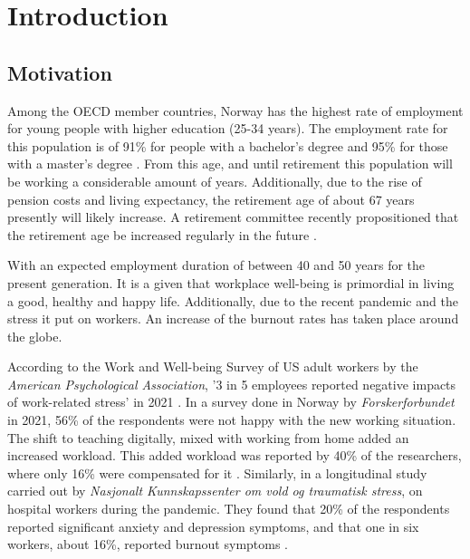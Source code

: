 \chapter{Introduction}


\section{Motivation}
Among the OECD member countries, Norway has the highest rate of employment for young people with higher education (25-34 years). The employment rate for this population is of 91\% for people with a bachelor's degree and 95\% for those with a master's degree \parencite{fazli_hoy_2022}. From this age, and until retirement this population will be working a considerable amount of years. Additionally, due to the rise of pension costs and living expectancy, the retirement age of about 67 years presently \parencite{noauthor_pensjonsalder_nodate} will likely increase. A retirement committee recently propositioned that the retirement age be increased regularly in the future \parencite{haugan_pensjonsutvalget_2022}.

With an expected employment duration of between 40 and 50 years for the present generation. It is a given that workplace well-being is primordial in living a good, healthy and happy life. Additionally, due to the recent pandemic and the stress it put on workers. An increase of the burnout rates has taken place around the globe. 

According to the Work and Well-being Survey of US adult workers by the \textit{American Psychological Association}, '3 in 5 employees reported negative impacts of work-related stress' in 2021 \parencite{abramson_burnout_2022}. In a survey done in Norway by \textit{Forskerforbundet} in 2021, 56\% of the respondents were not happy with the new working situation. The shift to teaching digitally, mixed with working from home added an increased workload. This added workload was reported by 40\% of the researchers, where only 16\% were compensated for it \parencite{svarstad_tarene_2021}. Similarly, in a longitudinal study carried out by \textit{Nasjonalt Kunnskapssenter om vold og traumatisk stress}, on hospital workers during the pandemic. They found that 20\% of the respondents reported significant anxiety and depression symptoms, and that one in six workers, about 16\%, reported burnout symptoms \parencite{noauthor_studie_2022}.

